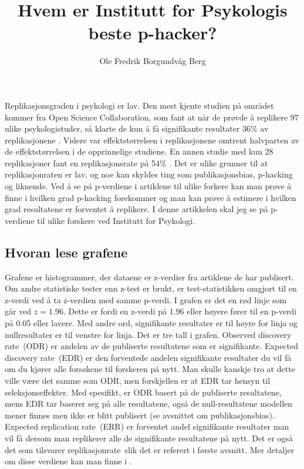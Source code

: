 \documentclass[doc,norsk]{apa7}
\title{Hvem er Institutt for Psykologis beste p-hacker?}
\author{Ole Fredrik Borgundvåg Berg}
\affiliation{NTNU}
\begin{document}
\maketitle

Replikasjonsgraden i psykologi er lav. Den mest kjente studien på området kommer fra Open Science Collaboration, som fant at når de prøvde å replikere 97 ulike psykologistuder, så klarte de kun å få signifikante resultater 36\% av replikasjonene \parencite{open-replikasjon}. Videre var effektstørrelsen i replikasjonene omtrent halvparten av de effektstørrelsen i de opprinnelige studiene. En annen studie med kun 28 replikasjoner fant en replikasjonsrate på 54\% \parencite{replikasjonsrate-2}. Det er ulike grunner til at replikasjonraten er lav, og noe kan skyldes ting som publikasjonsbias, p-hacking og liknende. Ved å se på p-verdiene i artiklene til ulike forkere kan man prøve å finne i hvilken grad p-hacking forekommer og man kan prøve å estimere i hvilken grad resultatene er forventet å replikere. I denne artikkelen skal jeg se på p-verdiene til ulike forskere ved Institutt for Psykologi. 

\subsection{Hvoran lese grafene}
Grafene er histogrammer, der dataene er z-verdier fra artiklene de har publisert. Om andre statistiske tester enn z-test er brukt, er test-statistikken omgjort til en z-verdi ved å ta z-verdien med samme p-verdi. I grafen er det en rød linje som går ved $z=1.96$. Dette er fordi en z-verdi på 1.96 eller høyere fører til en p-verdi på 0.05 eller lavere. Med andre ord, signifikante resultater er til høyre for linja og nullresultater er til venstre for linja. Det er tre tall i grafen. \guillemetleft Observed discovery rate\guillemetright\ (ODR) er andelen av de publiserte resultatene som er signifikante. \guillemetleft Expected discovery rate\guillemetright\ (EDR) er den forventede andelen signifikante resultater du vil få om du kjører alle forsøkene til forskeren på nytt. Man skulle kanskje tro at dette ville være det samme som ODR, men forskjellen er at EDR tar hensyn til seleksjonseffekter. Med spesifikt, er ODR basert på de publiserte resultatene, mens EDR tar baserer seg på alle resultatene, også de null-resultatene modellen mener finnes men ikke er blitt publisert (se avsnittet om publikasjonsbias). \guillemotleft Expected replication rate\guillemetright\ (ERR) er forventet andel signifikante resultater man vil få dersom man replikerer alle de signifikante resultatene på nytt. Det er også det som tilsvarer \guillemetleft replikasjonrate\guillemetright\ slik det er referert i første avsnitt. Mer detaljer om disse verdiene kan man finne i \textcite{z-curve-implementasjon}.
\end{document}
